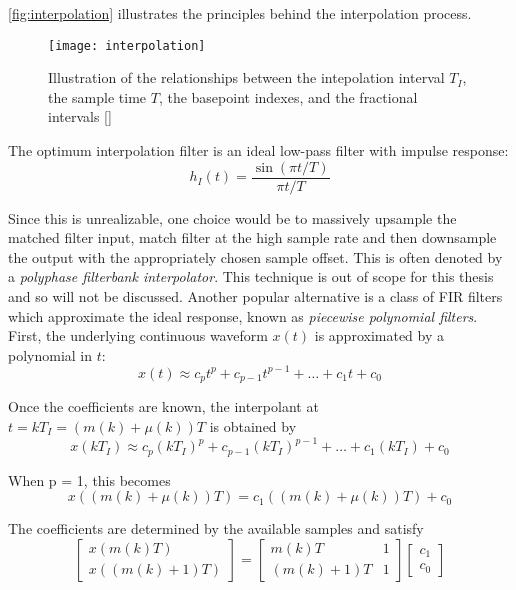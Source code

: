 \autoref{fig:interpolation} illustrates the principles behind the interpolation process.

\begin{figure}[H]
  \centering
  \texttt{[image: interpolation]}
  \caption{Illustration of the relationships between the intepolation interval $T_I$, the sample time $T$, the basepoint indexes, and the fractional intervals [\citeauthor{digcomm_discrete_approach}]}
  \label{fig:interpolation}
\end{figure}

The optimum interpolation filter is an ideal low-pass filter with impulse response:
\begin{equation}
h_I(t)=\frac{\sin(\pi t/T)}{\pi t/T}
\end{equation}

Since this is unrealizable, one choice would be to massively upsample the matched filter input, match filter at the high sample rate and then downsample the output with the appropriately chosen sample offset. This is often denoted by a \emph{polyphase filterbank interpolator}. This technique is out of scope for this thesis and so will not be discussed. Another popular alternative is a class of FIR filters which approximate the ideal response, known as \emph{piecewise polynomial filters}. First, the underlying continuous waveform $x(t)$ is approximated by a polynomial in $t$:
\begin{equation}
x(t)\approx c_pt^p+c_{p-1}t^{p-1}+\ldots+c_1t+c_0
\end{equation}

Once the coefficients are known, the interpolant at $t=kT_I=\left(m(k)+\mu(k)\right)T$ is obtained by
\begin{equation}
x(kT_I)\approx c_p(kT_I)^p+c_{p-1}(kT_I)^{p-1}+\ldots+c_1(kT_I)+c_0
\end{equation}

When p = 1, this becomes
\begin{equation}
x((m(k)+\mu(k))T)=c_1((m(k)+\mu(k))T) + c_0
\end{equation}

The coefficients are determined by the available samples and satisfy
\begin{equation}\begin{bmatrix}
x(m(k)T)\\
x((m(k)+1)T)
\end{bmatrix}
=
\begin{bmatrix}
m(k)T & 1\\
(m(k)+1)T & 1
\end{bmatrix}
\begin{bmatrix}
c_1\\
c_0
\end{bmatrix}
\end{equation}

